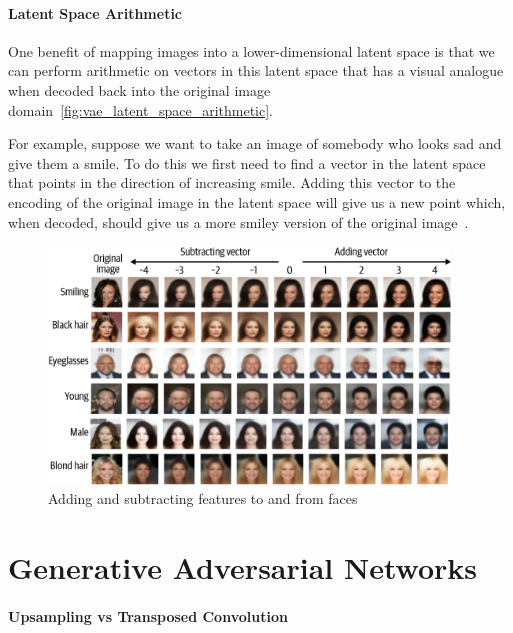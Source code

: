 \paragraph{Latent Space Arithmetic}

One benefit of mapping images into a lower-dimensional latent space is that we can perform arithmetic on vectors in this latent space that has a visual analogue when decoded back into the original image domain~\autoref{fig:vae_latent_space_arithmetic}.

For example, suppose we want to take an image of somebody who looks sad and give them a smile.
To do this we first need to find a vector in the latent space that points in the direction of increasing smile.
Adding this vector to the encoding of the original image in the latent space will give us a new point which, when decoded, should give us a more smiley version of the original image~\cite{foster2022generative}.

\begin{figure}
	\begin{center}
		\includegraphics[width=0.95\textwidth]{figures/vae_latent_space_arithmetic}
	\end{center}
	\caption{Adding and subtracting features to and from faces}\label{fig:vae_latent_space_arithmetic}
\end{figure}

\section{Generative Adversarial Networks}

\paragraph{Upsampling vs Transposed Convolution}

